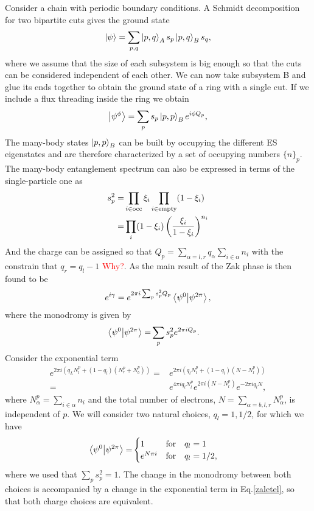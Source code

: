 \documentclass[twocolumn,amsmath,longbibliography,amssymb,superscriptaddress]{revtex4-1}
\begin{document}
Consider a chain with periodic boundary conditions. A Schmidt decomposition for two bipartite cuts gives the ground state
\begin{equation}
\ket{\psi} = \sum_{p,q} \ket{p,q}_A s_p \ket{p,q}_B s_q,
\end{equation}
where we assume that the size of each subsystem is big enough so that the cuts can be considered independent of each other. We can now take subsystem B and glue its ends together to obtain the ground state of a ring with a single cut. If we include a flux threading inside the ring we obtain
\begin{equation}
\ket{\psi^\phi} = \sum_p s_p \ket{p,p}_B e^{i\phi Q_p},
\end{equation}
The many-body states $\ket{p,p}_B$ can be built by occupying the different ES eigenstates and are therefore characterized by a set of occupying numbers $\{n\}_p$. The many-body entanglement spectrum can also be expressed in terms of the single-particle one \cite{Alexandrinata2011} as
\begin{align}
s_p^2 =& \prod_{i \in {\rm occ}} \xi_i \prod_{i \in {\rm empty}}(1-\xi_i) \\
=& \prod_i (1-\xi_i)\left(\frac{\xi_i}{1-\xi_i} \right)^{n_i}
\end{align}
And the charge can be assigned so that $Q_p = \sum_{\alpha = l,r} q_\alpha\sum_{i \in \alpha} n_i$ with the constrain that $q_r= q_l-1$ \textcolor{red}{Why?}. As the main result of \cite{Zaletel2014} the Zak phase is then found to be
\begin{align}
e^{i\gamma} = e^{2\pi i \sum_p s_p^2 Q_p}  \bra{\psi^0}\ket{\psi^{2\pi}},
\label{zaletel}
\end{align}
where the monodromy is given by
\begin{align}
\bra{\psi^0}\ket{\psi^{2\pi}} =& \sum_p s_p^2 e^{2\pi i Q_p}.
\end{align}
Consider the exponential term
\begin{align*}
e^{2\pi i (q_L N^p_l + (1-q_l)(N^p_r+N^p_b))} =& e^{2\pi i (q_l N^p_l + (1-q_l)(N-N^p_l))} \\
=& e^{4\pi i q_l N^p_l}e^{2 \pi i (N-N^p_l)}e^{-2\pi i q_l N },
\end{align*}
where $N^p_\alpha = \sum_{i \in \alpha} n_i$ and the total number of electrons, $N = \sum_{\alpha = b,l,r} N^p_\alpha$, is independent of $p$. We will consider two natural choices, $q_l = 1,1/2$, for which we have
\begin{align}
\bra{\psi^0}\ket{\psi^{2\pi}} =& 
\begin{cases}
1 & \text{for} \quad q_l = 1 \\
e^{N\pi i} & \text{for} \quad q_l = 1/2,
\end{cases}
\end{align}
where we used that $\sum_p s_p^2 = 1$. The change in the monodromy between both choices is accompanied by a change in the exponential term in Eq.\ref{zaletel}, so that both charge choices are equivalent.
\end{document}
